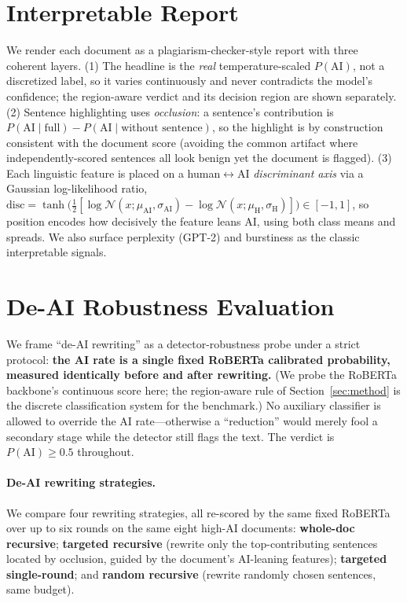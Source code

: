 \documentclass[11pt]{article}
\begin{document}
\section{Interpretable Report}
\label{sec:viz}

We render each document as a plagiarism-checker-style report with three
coherent layers. (1) The headline is the \emph{real} temperature-scaled
$P(\text{AI})$, not a discretized label, so it varies continuously and never
contradicts the model's confidence; the region-aware verdict and its decision
region are shown separately. (2) Sentence highlighting uses
\emph{occlusion}: a sentence's contribution is
$P(\text{AI}\mid\text{full})-P(\text{AI}\mid\text{without sentence})$, so the
highlight is by construction consistent with the document score (avoiding the
common artifact where independently-scored sentences all look benign yet the
document is flagged). (3) Each linguistic feature is placed on a
human$\leftrightarrow$AI \emph{discriminant axis} via a Gaussian
log-likelihood ratio,
$\text{disc}=\tanh\!\big(\tfrac{1}{2}[\log\mathcal{N}(x;\mu_{\text{AI}},
\sigma_{\text{AI}})-\log\mathcal{N}(x;\mu_{\text{H}},\sigma_{\text{H}})]\big)
\in[-1,1]$, so position encodes how decisively the feature leans AI, using
both class means and spreads. We also surface perplexity (GPT-2) and
burstiness as the classic interpretable signals.

\section{De-AI Robustness Evaluation}
\label{sec:robust}

We frame ``de-AI rewriting'' as a detector-robustness probe under a strict
protocol: \textbf{the AI rate is a single fixed RoBERTa calibrated probability,
measured identically before and after rewriting.} (We probe the RoBERTa
backbone's continuous score here; the region-aware rule of
Section~\ref{sec:method} is the discrete classification system for the
benchmark.) No auxiliary classifier is allowed to override the AI rate---otherwise
a ``reduction'' would merely fool a secondary stage while the detector still
flags the text. The verdict is $P(\text{AI})\geq0.5$ throughout.

\paragraph{De-AI rewriting strategies.} We compare four rewriting strategies,
all re-scored by the same fixed RoBERTa over up to six rounds on the same eight
high-AI documents: \textbf{whole-doc recursive}; \textbf{targeted recursive}
(rewrite only the top-contributing sentences located by occlusion, guided by
the document's AI-leaning features); \textbf{targeted single-round}; and
\textbf{random recursive} (rewrite randomly chosen sentences, same budget).
\end{document}
